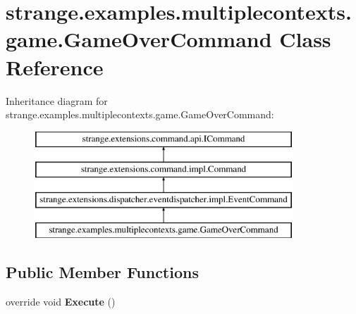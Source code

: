\hypertarget{classstrange_1_1examples_1_1multiplecontexts_1_1game_1_1_game_over_command}{\section{strange.\-examples.\-multiplecontexts.\-game.\-Game\-Over\-Command Class Reference}
\label{classstrange_1_1examples_1_1multiplecontexts_1_1game_1_1_game_over_command}
}
Inheritance diagram for strange.\-examples.\-multiplecontexts.\-game.\-Game\-Over\-Command\-:\begin{figure}[H]
\begin{center}
\leavevmode
\includegraphics[height=4.000000cm]{classstrange_1_1examples_1_1multiplecontexts_1_1game_1_1_game_over_command}
\end{center}
\end{figure}
\subsection*{Public Member Functions}
\begin{DoxyCompactItemize}
\item 
\hypertarget{classstrange_1_1examples_1_1multiplecontexts_1_1game_1_1_game_over_command_a13c559bf1754b7a312ef604228f9fe87}{override void {\bfseries Execute} ()}\label{classstrange_1_1examples_1_1multiplecontexts_1_1game_1_1_game_over_command_a13c559bf1754b7a312ef604228f9fe87}

\end{DoxyCompactItemize}
